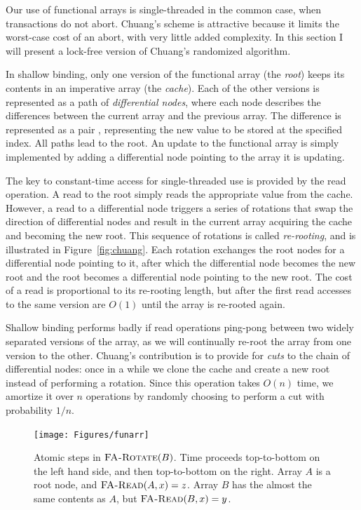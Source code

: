 Our use of functional arrays is single-threaded in the common case,
when transactions do not abort.  Chuang's scheme is attractive because
it limits the worst-case cost of an abort, with very little added
complexity.   In this section I will present a lock-free version of
Chuang's randomized algorithm.

In shallow binding, only one version of the functional array (the
\emph{root}) keeps its contents in an imperative array (the
\emph{cache}).   Each of the other versions is represented as a path
of \emph{differential nodes}, where each node describes the
differences between the current array and the previous array.  The
difference is represented as a pair ,
representing the new value to be stored at the specified index.
All paths lead to the root.  An update to the functional array is
simply implemented by adding a differential node pointing to the array it is
updating.

The key to constant-time access for single-threaded use is provided by the read
operation.  A read to the root simply reads the appropriate value from
the cache.  However, a read to a differential node triggers a series
of rotations that swap the direction of differential nodes and result
in the current array acquiring the cache and becoming the new root.
This sequence of rotations is called \emph{re-rooting}, and is
illustrated in Figure~\ref{fig:chuang}.  Each rotation
exchanges the root nodes for a differential node pointing to it, after
which the differential node becomes the new root and the root becomes
a differential node pointing to the new root. The cost of a read is
proportional to its re-rooting length, but after the first read
accesses to the same version are $O(1)$ until the array is re-rooted again.

Shallow binding performs badly if read operations ping-pong between two
widely separated versions of the array, as we will continually
re-root the array from one version to the other.
Chuang's contribution is to provide for \emph{cuts} to the chain of
differential nodes: once in a while we clone the cache and create a
new root instead of performing a rotation.  Since this operation takes
$O(n)$ time, we amortize it over $n$ operations by randomly
choosing to perform a cut with probability $1/n$.

\begin{figure}\centering%
\texttt{[image: Figures/funarr]}
\caption[Atomic steps in $\funcname{FA-Rotate}(B)$.]%
 {Atomic steps in $\funcname{FA-Rotate}(B)$.  Time proceeds top-to-bottom
  on the left hand side, and then top-to-bottom on the right.
  Array $A$ is a root node, and $\text{\sc FA-Read}(A, x)=z$.
  Array $B$ has the almost the same contents as $A$, but
  $\text{\sc FA-Read}(B, x)=y$.}
\label{fig:funarr}
\end{figure}

